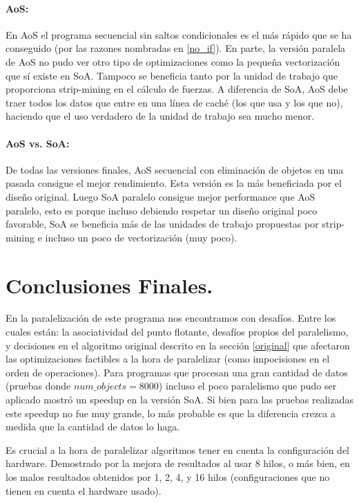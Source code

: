 \documentclass{article}
\begin{document}
\paragraph{AoS:}
En AoS el programa secuencial sin saltos condicionales es el más rápido que se ha conseguido (por las razones
nombradas en \ref{no_if}). En parte, la versión paralela de AoS no pudo ver otro tipo de optimizaciones como
la pequeña vectorización que sí existe en SoA. Tampoco se beneficia tanto por la unidad de trabajo que
proporciona strip-mining en el cálculo de fuerzas. A diferencia de SoA, AoS debe traer todos los
datos que entre en una línea de caché (los que usa y los que no), haciendo que el uso verdadero de la unidad
de trabajo sea mucho menor.

\paragraph{AoS vs. SoA:}
De todas las versiones finales, AoS secuencial con eliminación de objetos en una pasada consigue el mejor rendimiento.
Esta versión es la más beneficiada
por el diseño original. Luego SoA paralelo consigue mejor performance que AoS paralelo, esto es porque
incluso debiendo respetar un diseño original poco favorable, SoA se beneficia más de las unidades de trabajo
propuestas por strip-mining e incluso un poco de vectorización (muy poco).

\section{Conclusiones Finales.\label{conclusiones}}

En la paralelización de este programa nos encontramos con desafíos. Entre los cuales están: la asociatividad
del punto flotante, desafíos propios del paralelismo, y decisiones en el algoritmo original descrito en
la sección \ref{original} que afectaron las optimizaciones factibles a la hora de paralelizar (como impocisiones
en el orden de operaciones). Para programas que procesan una gran cantidad de datos (pruebas donde ${num\_objects=8000}$)
incluso el poco paralelismo que pudo ser aplicado mostró un speedup en la versión SoA. Si bien para las pruebas realizadas este speedup no fue
muy grande, lo más probable es que la diferencia crezca a medida que la cantidad de datos lo haga.

Es crucial a la hora de paralelizar algoritmos tener en cuenta la configuración del hardware. Demostrado por
la mejora de resultados al usar 8 hilos, o más bien, en los malos resultados obtenidos por
1, 2, 4, y 16 hilos (configuraciones que no tienen en cuenta el hardware usado).
\end{document}
